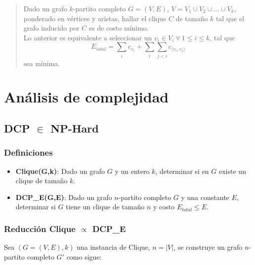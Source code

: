 \documentclass[letterpaper, 12pt]{report}
\begin{document}
\begin{quote}
    Dado un grafo $k$-partito completo $G = (V,E)$, $V = V_1 \cup V_2 \cup ... \cup V_k$, ponderado en vértices y aristas, hallar el 
    clique $C$ de tamaño $k$ tal que el grafo inducido por $C$ es de costo m\'inimo. \\
    
    Lo anterior es equivalente a seleccionar un $v_i \in V_i \ \forall \ 1 \leq i \leq k$, tal que  
    \[E_{total} = \sum_i c_{v_i} + \sum_i \sum_{j<i} c_{ \langle v_i,v_j \rangle }  \]
    sea m\'inima.
\end{quote}


\chapter{An\'alisis de complejidad}


\section{DCP $\in$ NP-Hard}



\subsection{Definiciones}


\begin{itemize}
    \item \textbf{Clique(G,k)}: Dado un grafo $G$ y un entero $k$, determinar si en $G$ existe un clique de tamaño $k$.
    \item \textbf{DCP\_E(G,E)}: Dado un grafo $n$-partito completo $G$ y una constante $E$, determinar si $G$ tiene un clique
    de tamaño $n$ y costo $E_{total} \leq E$.
\end{itemize}

\subsection{Reducción Clique $\propto$ DCP\_E}

Sea $(G=(V,E),k)$ una instancia de Clique, $n=|V|$, se construye un grafo $n$-partito completo $G'$  como sigue:
\end{document}
